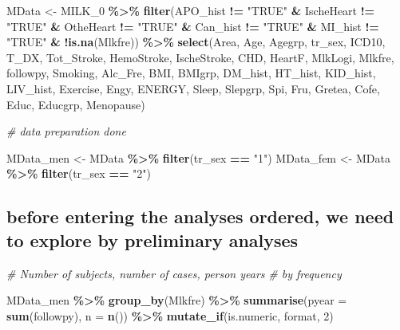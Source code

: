 \documentclass[
]{article}
\newenvironment{Shaded}{\begin{snugshade}}{\end{snugshade}}
\newcommand{\CommentTok}[1]{\textcolor[rgb]{0.56,0.35,0.01}{\textit{#1}}}
\newcommand{\DataTypeTok}[1]{\textcolor[rgb]{0.13,0.29,0.53}{#1}}
\newcommand{\DecValTok}[1]{\textcolor[rgb]{0.00,0.00,0.81}{#1}}
\newcommand{\KeywordTok}[1]{\textcolor[rgb]{0.13,0.29,0.53}{\textbf{#1}}}
\newcommand{\NormalTok}[1]{#1}
\newcommand{\OperatorTok}[1]{\textcolor[rgb]{0.81,0.36,0.00}{\textbf{#1}}}
\newcommand{\StringTok}[1]{\textcolor[rgb]{0.31,0.60,0.02}{#1}}
\begin{document}
\begin{Shaded}
\begin{Highlighting}[]
\NormalTok{MData \textless{}{-}}\StringTok{ }\NormalTok{MILK\_}\DecValTok{0} \OperatorTok{\%\textgreater{}\%}
\StringTok{  }\KeywordTok{filter}\NormalTok{(APO\_hist }\OperatorTok{!=}\StringTok{ "TRUE"} \OperatorTok{\&}\StringTok{ }\NormalTok{IscheHeart }\OperatorTok{!=}\StringTok{ "TRUE"} \OperatorTok{\&}\StringTok{ }
\StringTok{           }\NormalTok{OtheHeart }\OperatorTok{!=}\StringTok{ "TRUE"} \OperatorTok{\&}\StringTok{ }\NormalTok{Can\_hist }\OperatorTok{!=}\StringTok{ "TRUE"} \OperatorTok{\&}\StringTok{ }\NormalTok{MI\_hist }\OperatorTok{!=}\StringTok{ "TRUE"} \OperatorTok{\&}\StringTok{ }\OperatorTok{!}\KeywordTok{is.na}\NormalTok{(Mlkfre)) }\OperatorTok{\%\textgreater{}\%}\StringTok{ }
\StringTok{  }\KeywordTok{select}\NormalTok{(Area, Age, Agegrp, tr\_sex, ICD10, T\_DX, Tot\_Stroke, HemoStroke, IscheStroke, CHD, HeartF, MlkLogi, }
\NormalTok{         Mlkfre, followpy, Smoking, Alc\_Fre, BMI, BMIgrp, DM\_hist, HT\_hist, KID\_hist, }
\NormalTok{         LIV\_hist, Exercise, Engy, ENERGY, Sleep, Slepgrp, Spi, Fru, Gretea, Cofe, Educ,}
\NormalTok{         Educgrp, Menopause)}

\CommentTok{\# data preparation done}

\NormalTok{MData\_men \textless{}{-}}\StringTok{ }\NormalTok{MData }\OperatorTok{\%\textgreater{}\%}\StringTok{ }
\StringTok{  }\KeywordTok{filter}\NormalTok{(tr\_sex }\OperatorTok{==}\StringTok{ "1"}\NormalTok{)}
\NormalTok{MData\_fem \textless{}{-}}\StringTok{ }\NormalTok{MData }\OperatorTok{\%\textgreater{}\%}\StringTok{ }
\StringTok{  }\KeywordTok{filter}\NormalTok{(tr\_sex }\OperatorTok{==}\StringTok{ "2"}\NormalTok{)}
\end{Highlighting}
\end{Shaded}

\hypertarget{before-entering-the-analyses-ordered-we-need-to-explore-by-preliminary-analyses}{%
\subsection{before entering the analyses ordered, we need to explore by
preliminary
analyses}\label{before-entering-the-analyses-ordered-we-need-to-explore-by-preliminary-analyses}}

\begin{Shaded}
\begin{Highlighting}[]
\CommentTok{\# Number of subjects, number of cases, person years }
\CommentTok{\# by frequency}

\NormalTok{MData\_men }\OperatorTok{\%\textgreater{}\%}
\StringTok{  }\KeywordTok{group\_by}\NormalTok{(Mlkfre) }\OperatorTok{\%\textgreater{}\%}
\StringTok{  }\KeywordTok{summarise}\NormalTok{(}\DataTypeTok{pyear =} \KeywordTok{sum}\NormalTok{(followpy), }\DataTypeTok{n =} \KeywordTok{n}\NormalTok{()) }\OperatorTok{\%\textgreater{}\%}\StringTok{ }
\StringTok{  }\KeywordTok{mutate\_if}\NormalTok{(is.numeric, format, }\DecValTok{2}\NormalTok{)}
\end{Highlighting}
\end{Shaded}
\end{document}
